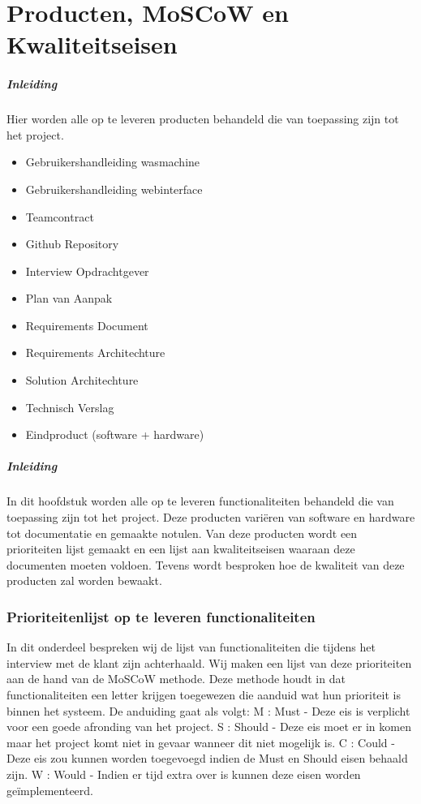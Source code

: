 \chapter{Producten, MoSCoW en Kwaliteitseisen}
\subtitle{Producten}
\paragraph{Inleiding}
Hier worden alle op te leveren producten behandeld die van toepassing zijn tot het project.
\begin{itemize}
	\item Gebruikershandleiding wasmachine
	\item Gebruikershandleiding webinterface
	\item Teamcontract
	\item Github Repository
	\item Interview Opdrachtgever
	\item Plan van Aanpak
	\item Requirements Document
	\item Requirements Architechture
	\item Solution Architechture
	\item Technisch Verslag
	\item Eindproduct (software + hardware)
\end{itemize}

\subtitle{MoSCoW Prioritisering}
\paragraph{Inleiding}
In dit hoofdstuk worden alle op te leveren functionaliteiten behandeld die van toepassing zijn tot het project.
Deze producten variëren van software en hardware tot documentatie en gemaakte notulen.
Van deze producten wordt een prioriteiten lijst gemaakt en een lijst aan kwaliteitseisen waaraan deze documenten moeten voldoen.
Tevens wordt besproken hoe de kwaliteit van deze producten zal worden bewaakt.

\subsection{Prioriteitenlijst op te leveren functionaliteiten}
In dit onderdeel bespreken wij de lijst van functionaliteiten die tijdens het interview met de klant zijn achterhaald.
Wij maken een lijst van deze prioriteiten aan de hand van de MoSCoW methode. Deze methode houdt in dat functionaliteiten een letter krijgen toegewezen die aanduid wat hun prioriteit is binnen het systeem.
De anduiding gaat als volgt: 
M : Must - Deze eis is verplicht voor een goede afronding van het project.
S : Should - Deze eis moet er in komen maar het project komt niet in gevaar wanneer dit niet mogelijk is.
C : Could - Deze eis zou kunnen worden toegevoegd indien de Must en Should eisen behaald zijn.
W : Would - Indien er tijd extra over is kunnen deze eisen worden geïmplementeerd.

